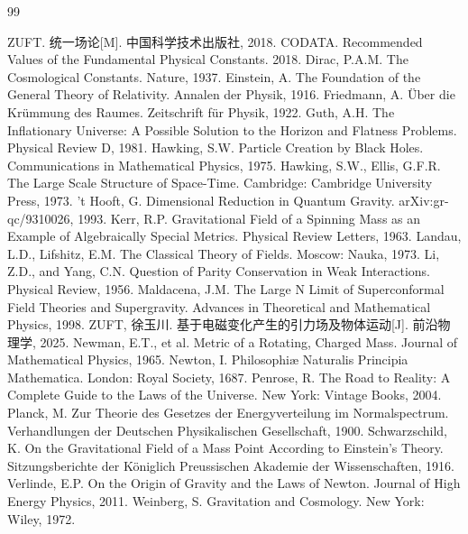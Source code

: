 \documentclass[12pt,a4paper]{article}
\begin{document}
\begin{thebibliography}{99}

 ZUFT. 统一场论[M]. 中国科学技术出版社, 2018.
 CODATA. Recommended Values of the Fundamental Physical Constants. 2018.
 Dirac, P.A.M. The Cosmological Constants. Nature, 1937.
 Einstein, A. The Foundation of the General Theory of Relativity. Annalen der Physik, 1916.
 Friedmann, A. Über die Krümmung des Raumes. Zeitschrift für Physik, 1922.
 Guth, A.H. The Inflationary Universe: A Possible Solution to the Horizon and Flatness Problems. Physical Review D, 1981.
 Hawking, S.W. Particle Creation by Black Holes. Communications in Mathematical Physics, 1975.
 Hawking, S.W., Ellis, G.F.R. The Large Scale Structure of Space-Time. Cambridge: Cambridge University Press, 1973.
 't Hooft, G. Dimensional Reduction in Quantum Gravity. arXiv:gr-qc/9310026, 1993.
 Kerr, R.P. Gravitational Field of a Spinning Mass as an Example of Algebraically Special Metrics. Physical Review Letters, 1963.
 Landau, L.D., Lifshitz, E.M. The Classical Theory of Fields. Moscow: Nauka, 1973.
 Li, Z.D., and Yang, C.N. Question of Parity Conservation in Weak Interactions. Physical Review, 1956.
 Maldacena, J.M. The Large N Limit of Superconformal Field Theories and Supergravity. Advances in Theoretical and Mathematical Physics, 1998.
 ZUFT, 徐玉川. 基于电磁变化产生的引力场及物体运动[J]. 前沿物理学, 2025.
 Newman, E.T., et al. Metric of a Rotating, Charged Mass. Journal of Mathematical Physics, 1965.
 Newton, I. Philosophiæ Naturalis Principia Mathematica. London: Royal Society, 1687.
 Penrose, R. The Road to Reality: A Complete Guide to the Laws of the Universe. New York: Vintage Books, 2004.
 Planck, M. Zur Theorie des Gesetzes der Energyverteilung im Normalspectrum. Verhandlungen der Deutschen Physikalischen Gesellschaft, 1900.
 Schwarzschild, K. On the Gravitational Field of a Mass Point According to Einstein's Theory. Sitzungsberichte der Königlich Preussischen Akademie der Wissenschaften, 1916.
 Verlinde, E.P. On the Origin of Gravity and the Laws of Newton. Journal of High Energy Physics, 2011.
 Weinberg, S. Gravitation and Cosmology. New York: Wiley, 1972.

\end{thebibliography}
\end{document}
